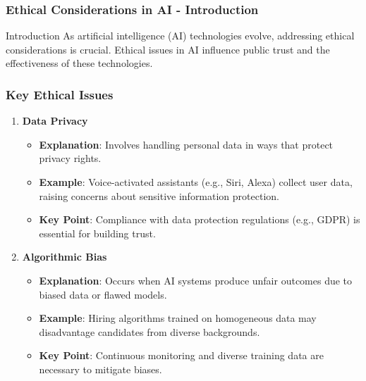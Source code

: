 \documentclass[aspectratio=169]{beamer}
\begin{document}
\begin{frame}[fragile]
    \frametitle{Ethical Considerations in AI - Introduction}
    \begin{block}{Introduction}
        As artificial intelligence (AI) technologies evolve, addressing ethical considerations is crucial.  
        Ethical issues in AI influence public trust and the effectiveness of these technologies.
    \end{block}
\end{frame}

\begin{frame}[fragile]
    \frametitle{Key Ethical Issues}
    \begin{enumerate}
        \item \textbf{Data Privacy}
        \begin{itemize}
            \item \textbf{Explanation}: Involves handling personal data in ways that protect privacy rights.
            \item \textbf{Example}: Voice-activated assistants (e.g., Siri, Alexa) collect user data, raising concerns about sensitive information protection.
            \item \textbf{Key Point}: Compliance with data protection regulations (e.g., GDPR) is essential for building trust.
        \end{itemize}

        \item \textbf{Algorithmic Bias}
        \begin{itemize}
            \item \textbf{Explanation}: Occurs when AI systems produce unfair outcomes due to biased data or flawed models.
            \item \textbf{Example}: Hiring algorithms trained on homogeneous data may disadvantage candidates from diverse backgrounds.
            \item \textbf{Key Point}: Continuous monitoring and diverse training data are necessary to mitigate biases.
        \end{itemize}    
    \end{enumerate}
\end{frame}
\end{document}
